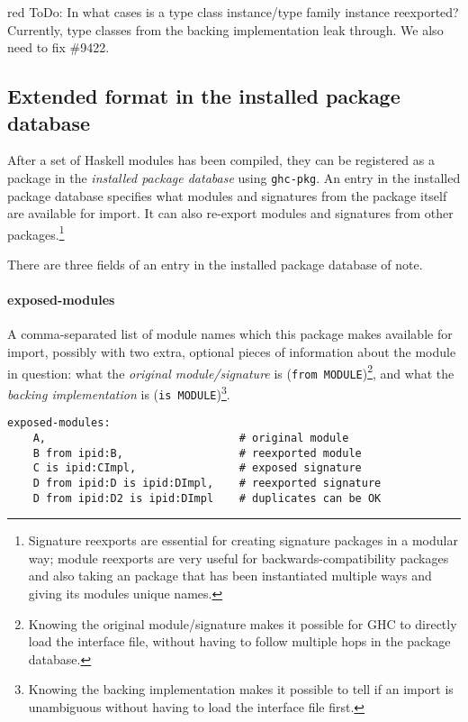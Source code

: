 \documentclass{article}
\begin{document}
\begin{color}{red}
ToDo: In what cases is a type class instance/type family instance reexported?
Currently, type classes from the backing implementation leak through.
We also need to fix \#9422.
\end{color}

\subsection{Extended format in the installed package database}\label{sec:pkgdb}

After a set of Haskell modules has been compiled, they can be registered
as a package in the \emph{installed package database} using
\texttt{ghc-pkg}.  An entry in the installed package database specifies
what modules and signatures from the package itself are available for
import. It can also re-export modules and signatures from other
packages.\footnote{Signature reexports are essential for creating
signature packages in a modular way; module reexports are very useful
for backwards-compatibility packages and also taking an package that has
been instantiated multiple ways and giving its modules unique names.}

There are three fields of an entry in the installed package database of note.

\paragraph{exposed-modules} A comma-separated list of
module names which this package makes available for import, possibly with two extra, optional pieces of information
about the module in question: what the \emph{original module/signature}
is (\texttt{from MODULE})\footnote{Knowing the original module/signature
makes it possible for GHC to directly load the interface file, without
having to follow multiple hops in the package database.}, and what the
\emph{backing implementation} is (\texttt{is MODULE})\footnote{Knowing
the backing implementation makes it possible to tell if an import is
unambiguous without having to load the interface file first.}.

\begin{verbatim}
exposed-modules:
    A,                              # original module
    B from ipid:B,                  # reexported module
    C is ipid:CImpl,                # exposed signature
    D from ipid:D is ipid:DImpl,    # reexported signature
    D from ipid:D2 is ipid:DImpl    # duplicates can be OK
\end{verbatim}
\end{document}
